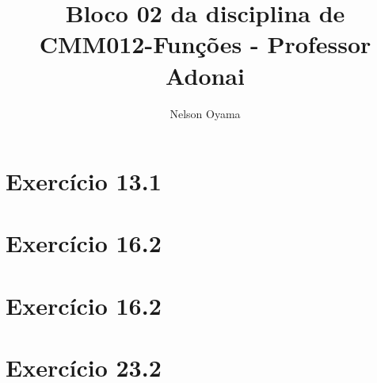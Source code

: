 \documentclass[a4paper]{article}
\author{Nelson Oyama}
\title{Bloco 02 da disciplina de CMM012-Funções - Professor Adonai}
\date{}
\begin{document}
	\maketitle

	\section{Exercício 13.1}
	
	
	\section{Exercício 16.2}
	

	\section{Exercício 16.2}
	
	
	\section{Exercício 23.2}
	
\end{document}
